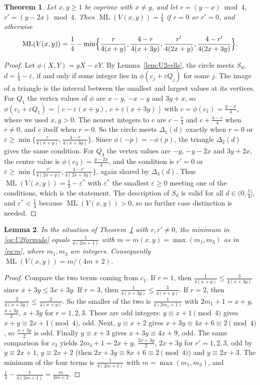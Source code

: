 \documentclass[12pt]{amsart}
\newtheorem{theorem}{Theorem}[section]
\newtheorem{lemma}[theorem]{Lemma}
\theoremstyle{definition}\newtheorem{definition}[theorem]{Definition}
\theoremstyle{remark}\newtheorem{remark}[theorem]{Remark}
\newcommand{\ML}{\operatorname{ML}}
\begin{document}
\begin{theorem}\label{thm:U2}
Let $x,y\ge1$ be coprime with $x\ne y$, and let $r=(y-x)\bmod4$, $r'=(y-2x)\bmod 4$. Then $\ML(V(x,y))=\frac14$ if $r=0$ or $r'=0$, and otherwise
\begin{equation}\label{eq:U2formula}
 \ML(V(x,y))=\frac14-\min\Bigl\{\frac{r}{4(x+y)},\frac{4-r}{4(x+3y)},\frac{r'}{4(2x+y)},\frac{4-r'}{4(2x+3y)}\Bigr\}.
\end{equation}
\end{theorem}
\begin{proof}
Let $\phi(X,Y)=yX-xY$. By Lemma~\ref{lem:U2cells}, the circle meets $S_d$, $d=\frac14-\varepsilon$, if and only if some integer lies in $\phi(c_j+\varepsilon Q_j)$ for some $j$. The image of a triangle is the interval between the smallest and largest values at its vertices. For $Q_1$ the vertex values of $\phi$ are $x-y$, $-x-y$ and $3y+x$, so $\phi(c_1+\varepsilon Q_1)=[\,c-\varepsilon(x+y),\ c+\varepsilon(x+3y)\,]$ with $c=\phi(c_1)=\frac{y-x}4$, where we used $x,y>0$. The nearest integers to $c$ are $c-\frac r4$ and $c+\frac{4-r}4$ when $r\ne0$, and $c$ itself when $r=0$. So the circle meets $\Delta_1(d)$ exactly when $r=0$ or $\varepsilon\ge\min\{\frac r{4(x+y)},\frac{4-r}{4(x+3y)}\}$. Since $\phi(-p)=-\phi(p)$, the triangle $\Delta_2(d)$ gives the same condition. For $Q_3$ the vertex values are $-y$, $-y-2x$ and $3y+2x$, the centre value is $\phi(c_3)=\frac{y-2x}4$, and the condition is $r'=0$ or $\varepsilon\ge\min\{\frac{r'}{4(2x+y)},\frac{4-r'}{4(2x+3y)}\}$, again shared by $\Delta_4(d)$. Thus $\ML(V(x,y))=\frac14-\varepsilon^*$ with $\varepsilon^*$ the smallest $\varepsilon\ge 0$ meeting one of the conditions, which is the statement. The description of $S_d$ is valid for all $d\in(0,\frac14]$, and $\varepsilon^*<\frac14$ because $\ML(V(x,y))>0$, so no further case distinction is needed.
\end{proof}

\begin{lemma}\label{lem:parity}
In the situation of Theorem~\ref{thm:U2} with $r,r'\ne0$, the minimum in \eqref{eq:U2formula} equals $\frac1{4(2m+1)}$ with $m=m(x,y)=\max(m_1,m_3)$ as in \eqref{eq:m}, where $m_1,m_3$ are integers. Consequently $\ML(V(x,y))=m/(4m+2)$.
\end{lemma}
\begin{proof}
Compare the two terms coming from $c_1$. If $r=1$, then $\frac1{4(x+y)}\le\frac3{4(x+3y)}$ since $x+3y\le 3x+3y$. If $r=3$, then $\frac1{4(x+3y)}\le\frac3{4(x+y)}$. If $r=2$, then $\frac2{4(x+3y)}\le\frac2{4(x+y)}$. So the smaller of the two is $\frac1{4(2m_1+1)}$ with $2m_1+1=x+y$, $\frac{x+3y}2$, $x+3y$ for $r=1,2,3$. These are odd integers: $y\equiv x+1\pmod4$ gives $x+y\equiv 2x+1\pmod 4$, odd. Next, $y\equiv x+2$ gives $x+3y\equiv 4x+6\equiv2\pmod4$, so $\frac{x+3y}2$ is odd. Finally $y\equiv x+3$ gives $x+3y\equiv 4x+9$, odd. The same comparison for $c_3$ yields $2m_3+1=2x+y$, $\frac{2x+3y}2$, $2x+3y$ for $r'=1,2,3$, odd by $y\equiv 2x+1$, $y\equiv2x+2$ (then $2x+3y\equiv 8x+6\equiv 2\pmod 4$) and $y\equiv 2x+3$. The minimum of the four terms is $\frac1{4(2m+1)}$ with $m=\max(m_1,m_3)$, and $\frac14-\frac1{4(2m+1)}=\frac{m}{4m+2}$.
\end{proof}
\end{document}
